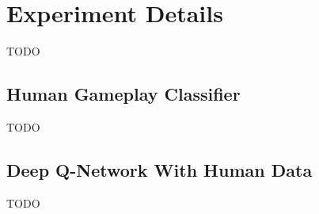 \documentclass[letterpaper, 10pt, conference]{ieeeconf}
\begin{document}
\section{Experiment Details}\label{app:experiment_details}

TODO

\subsection{Human Gameplay Classifier}\label{app:experiment_details_human}

TODO

\subsection{Deep Q-Network With Human Data}\label{app:experiment_details_dqn}

TODO
\end{document}
